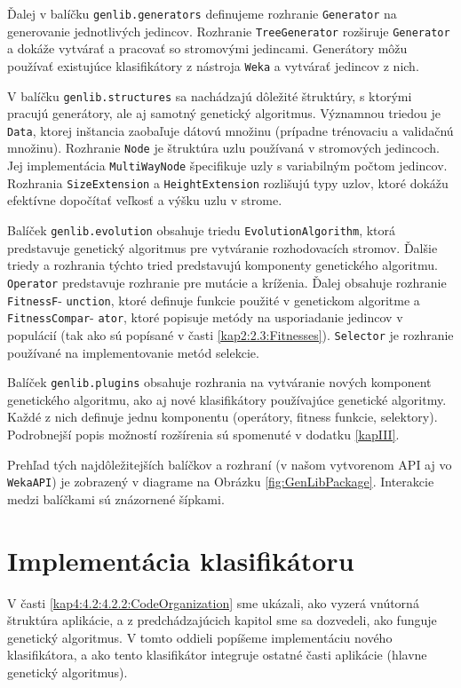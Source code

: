 Ďalej v balíčku \verb|genlib.generators| definujeme rozhranie  \verb|Generator| na generovanie jednotlivých jedincov. Rozhranie \verb|TreeGenerator| rozširuje \verb|Generator| a dokáže vytvárať a pracovať so stromovými jedincami. Generátory môžu používať existujúce klasifikátory z nástroja \verb|Weka| a vytvárať jedincov z nich.

V balíčku \verb|genlib.structures| sa nachádzajú dôležité štruktúry, s ktorými pracujú generátory, ale aj samotný genetický algoritmus. Významnou triedou je \verb|Data|, ktorej inštancia zaobaľuje dátovú množinu (prípadne trénovaciu a validačnú množinu). Rozhranie \verb|Node| je štruktúra uzlu používaná v stromových jedincoch. Jej implementácia \verb|MultiWayNode| špecifikuje uzly s variabilným počtom jedincov. Rozhrania \verb|SizeExtension| a \verb|HeightExtension| rozlišujú typy uzlov, ktoré dokážu efektívne dopočítať veľkosť a výšku uzlu v strome.

Balíček \verb|genlib.evolution| obsahuje triedu \verb|EvolutionAlgorithm|, ktorá predstavuje genetický algoritmus pre vytváranie rozhodovacích stromov. Ďalšie triedy a rozhrania týchto tried predstavujú komponenty genetického algoritmu. \verb|Operator| predstavuje rozhranie pre mutácie a kríženia. Ďalej obsahuje rozhranie \verb|FitnessF|- \verb|unction|, ktoré definuje funkcie použité v genetickom algoritme a \verb|FitnessCompar|- \verb|ator|, ktoré popisuje metódy na usporiadanie jedincov v populácií (tak ako sú popísané v časti \ref{kap2:2.3:Fitnesses}). \verb|Selector| je rozhranie používané na implementovanie metód selekcie.

Balíček \verb|genlib.plugins| obsahuje rozhrania na vytváranie nových komponent genetického algoritmu, ako aj nové klasifikátory používajúce genetické algoritmy. Každé z nich definuje jednu komponentu (operátory, fitness funkcie, selektory). Podrobnejší popis možností rozšírenia sú spomenuté v dodatku \ref{kapIII}.

Prehľad tých najdôležitejších balíčkov a rozhraní (v našom vytvorenom API aj vo \verb|WekaAPI|) je zobrazený v diagrame na Obrázku \ref{fig:GenLibPackage}. Interakcie medzi balíčkami sú znázornené šípkami.
\section{Implementácia klasifikátoru}\label{kap4:4.3:Implementation}
V časti \ref{kap4:4.2:4.2.2:CodeOrganization} sme ukázali, ako vyzerá vnútorná štruktúra aplikácie, a z predchádzajúcich kapitol sme sa dozvedeli, ako funguje genetický algoritmus. V tomto oddieli popíšeme implementáciu nového klasifikátora, a ako tento klasifikátor integruje ostatné časti aplikácie (hlavne genetický algoritmus).

